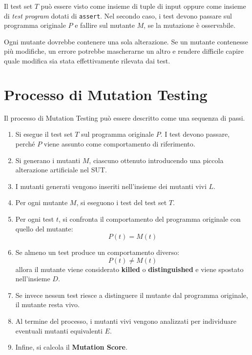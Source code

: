 \begin{notaslide}
Il test set \(T\) può essere visto come insieme di tuple di input oppure come insieme di \emph{test program} dotati di \texttt{assert}. Nel secondo caso, i test devono passare sul programma originale \(P\) e fallire sul mutante \(M\), se la mutazione è osservabile.
\end{notaslide}

\begin{notaprof}
Ogni mutante dovrebbe contenere una sola alterazione. Se un mutante contenesse più modifiche, un errore potrebbe mascherarne un altro e rendere difficile capire quale modifica sia stata effettivamente rilevata dai test.
\end{notaprof}

\section{Processo di Mutation Testing}

Il processo di Mutation Testing può essere descritto come una sequenza di passi.

\begin{enumerate}
    \item Si esegue il test set \(T\) sul programma originale \(P\). I test devono passare, perché \(P\) viene assunto come comportamento di riferimento.

    \item Si generano i mutanti \(M\), ciascuno ottenuto introducendo una piccola alterazione artificiale nel SUT.

    \item I mutanti generati vengono inseriti nell'insieme dei mutanti vivi \(L\).

    \item Per ogni mutante \(M\), si eseguono i test del test set \(T\).

    \item Per ogni test \(t\), si confronta il comportamento del programma originale con quello del mutante:
    \[
        P(t) = M(t)
    \]

    \item Se almeno un test produce un comportamento diverso:
    \[
        P(t) \neq M(t)
    \]
    allora il mutante viene considerato \textbf{killed} o \textbf{distinguished} e viene spostato nell'insieme \(D\).

    \item Se invece nessun test riesce a distinguere il mutante dal programma originale, il mutante resta vivo.

    \item Al termine del processo, i mutanti vivi vengono analizzati per individuare eventuali mutanti equivalenti \(E\).

    \item Infine, si calcola il \textbf{Mutation Score}.
\end{enumerate}

